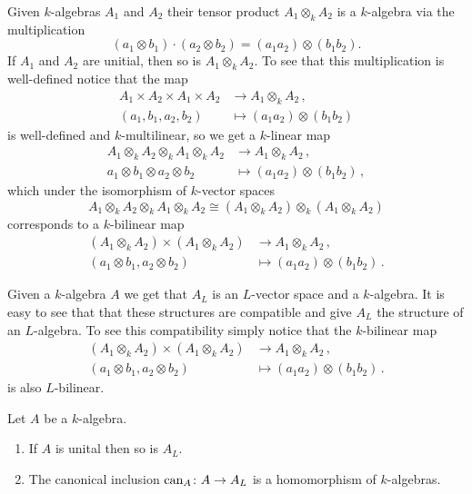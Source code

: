 Given $k$-algebras $A_1$ and $A_2$ their tensor product $A_1 \otimes_k A_2$ is a $k$-algebra via the multiplication
\[
    (a_1 \otimes b_1) \cdot (a_2 \otimes b_2)
  = (a_1 a_2) \otimes (b_1 b_2).
\]
If $A_1$ and $A_2$ are unitial, then so is $A_1 \otimes_k A_2$.
To see that this multiplication is well-defined notice that the map
\begin{align*}
            A_1 \times A_2 \times A_1 \times A_2
  &\to      A_1 \otimes_k A_2 \,, \\
            (a_1, b_1, a_2, b_2)
  &\mapsto  (a_1 a_2) \otimes (b_1 b_2)
\end{align*}
is well-defined and $k$-multilinear, so we get a $k$-linear map
\begin{align*}
            A_1 \otimes_k A_2 \otimes_k A_1 \otimes_k A_2
  &\to      A_1 \otimes_k A_2 \,, \\
            a_1 \otimes b_1 \otimes a_2 \otimes b_2
  &\mapsto  (a_1 a_2) \otimes (b_1 b_2) \,,
\end{align*}
which under the isomorphism of $k$-vector spaces
\[
        A_1 \otimes_k A_2 \otimes_k A_1 \otimes_k A_2
  \cong (A_1 \otimes_k A_2) \otimes_k (A_1 \otimes_k A_2)
\]
corresponds to a $k$-bilinear map
\begin{align*}
            (A_1 \otimes_k A_2) \times (A_1 \otimes_k A_2)
  &\to      A_1 \otimes_k A_2 \,, \\
            (a_1 \otimes b_1, a_2 \otimes b_2)
  &\mapsto  (a_1 a_2) \otimes (b_1 b_2) \,.
\end{align*}


Given a $k$-algebra $A$ we get that $A_L$ is an $L$-vector space and a $k$-algebra.
It is easy to see that that these structures are compatible and give $A_L$ the structure of an $L$-algebra.
To see this compatibility simply notice that the $k$-bilinear map
\begin{align*}
            (A_1 \otimes_k A_2) \times (A_1 \otimes_k A_2)
  &\to      A_1 \otimes_k A_2 \,, \\
            (a_1 \otimes b_1, a_2 \otimes b_2)
  &\mapsto  (a_1 a_2) \otimes (b_1 b_2) \,.
\end{align*}
is also $L$-bilinear.


\begin{rem}
  Let $A$ be a $k$-algebra.
  \begin{enumerate}[label=\emph{\alph*)},leftmargin=*]
    \item
    If $A$ is unital then so is $A_L$.
    \item
    The canonical inclusion $\operatorname{can}_A \colon A \to A_L$ is a homomorphism of $k$-algebras.
  \end{enumerate}
\end{rem}


